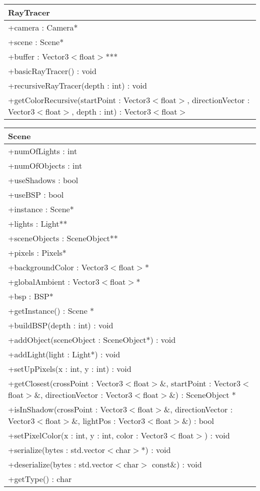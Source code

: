 \begin{center}
    \begin{tabular}{|l|}
    \hline
    RayTracer \\ \hline
    +camera : Camera* \\
    +scene : Scene* \\
    +buffer : Vector3$<$float$>$*** \\ \hline
	+basicRayTracer() : void \\
	+recursiveRayTracer(depth : int) : void \\
	+getColorRecursive(startPoint : Vector3$<$float$>$, directionVector : Vector3$<$float$>$, depth : int) : Vector3$<$float$>$ \\
	\hline
    \end{tabular}
\end{center}

\begin{center}
    \begin{tabular}{|l|}
    \hline
    Scene \\ \hline
    +numOfLights : int \\
    +numOfObjects : int \\
    +useShadows : bool \\
    +useBSP : bool \\
    +instance : Scene* \\
    +lights : Light** \\
    +sceneObjects : SceneObject** \\
    +pixels : Pixels* \\
    +backgroundColor : Vector3$<$float$>$* \\
    +globalAmbient : Vector3$<$float$>$* \\
    +bsp : BSP* \\
    \hline
	+getInstance() : Scene * \\
	+buildBSP(depth : int) : void \\
	+addObject(sceneObject : SceneObject*) : void \\
	+addLight(light : Light*) : void \\
	+setUpPixels(x : int, y : int) : void \\
	+getClosest(crossPoint : Vector3$<$float$>$\&, startPoint : Vector3$<$float$>$\&, directionVector : Vector3$<$float$>$\&) : SceneObject * \\
	+isInShadow(crossPoint : Vector3$<$float$>$\&, directionVector : Vector3$<$float$>$\&, lightPos : Vector3$<$float$>$\&) : bool \\
	+setPixelColor(x : int, y : int, color : Vector3$<$float$>$) : void \\
	+serialize(bytes : std.vector$<$char$>$*) : void \\
	+deserialize(bytes : std.vector$<$char$>$ const\&) : void \\
	+getType() : char \\
	\hline
    \end{tabular}
\end{center}

